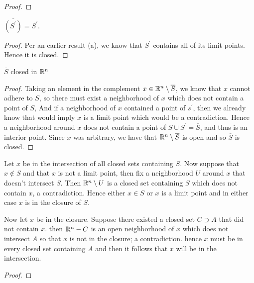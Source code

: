 \begin{alphaparts}
\begin{proof}
        \end{proof}

        \questionpart
        $\overline{(S^\prime)} = S^\prime$. 

        \begin{proof}
            Per an earlier result (a), we know that $S^\prime$ contains all of its limit points. Hence 
            it is closed. 
        \end{proof}


        \questionpart 
        $\overline{S}$ closed in $\mathbb{R}^n$

        \begin{proof}
            Taking an element in the complement $x \in \mathbb{R}^n \setminus \overline{S}$, we know that $x$ cannot adhere to $S$, 
            so there must exist a neighborhood of $x$ which does not contain a point of $S$, And if a neighborhood of $x$ contained a point of $s^\prime$, 
            then we already know that would imply $x$ is a limit point which would be a contradiction. Hence  a neighborhood around $x$ does not 
            contain a point of $S \cup S^\prime = \overline{S}$, and thus is an interior point. Since $x$ was arbitrary, we have that 
            $\mathbb{R}^n \setminus \overline{S}$ is open and so $\overline{S}$ is closed. 

        \end{proof}

        \questionpart 
        Let $x$ be in the intersection of all closed sets containing $S$. Now suppose that $x \notin S$  and that $x$ is not a limit point, 
        then fix a neighborhood $U$ around $x$ that doesn't intersect $S$. Then $\mathbb{R}^n \setminus U$ is a closed set containing $S$ which does not contain $x$, a contradiction. 
        Hence either $x \in S$ or $x$ is a limit point and in either case $x$ is in the closure of $S$. 

        Now let $x$ be in the closure. Suppose there existed a closed set $C \supset A$ that did not contain $x$. 
        then $\mathbb{R}^n - C$ is an open neighborhood of $x$ which does not intersect $A$ so that $x$ is not in the closure; a contradiction. 
        hence $x$ must be in every closed set containing $A$ and then it follows that $x$ will be in the intersection. 
        \begin{proof}
            
        \end{proof}
    \end{alphaparts}

